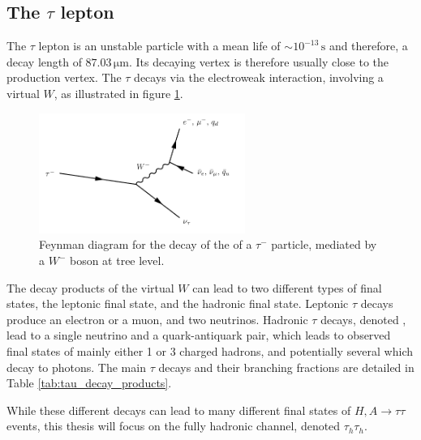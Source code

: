 \subsection{The $\tau$ lepton}
\label{sec:tau_lepton}
The $\tau$ lepton is an unstable particle with a mean life of $\sim 10^{-13}\,\mathrm{s}$ \cite{pdg2016} and therefore, a decay length of $87.03\, \mathrm{\mu m}$. Its decaying vertex is therefore usually close to the production vertex. The $\tau$ decays via the electroweak interaction, involving a virtual $W$, as illustrated in figure \ref{fig:tau_decay}.

\begin{figure}
    \centering
    \includegraphics[width=0.6\textwidth]{Images/taudecay.pdf}
    \caption{Feynman diagram for the decay of the of a $\tau^-$ particle, mediated by a $W^-$ boson at tree level.}
    \label{fig:tau_decay}
\end{figure}

The decay products of the virtual $W$ can lead to two different types of final states, the leptonic final state, and the hadronic final state. Leptonic $\tau$ decays produce an electron or a muon, and two neutrinos. Hadronic $\tau$ decays, denoted \tauh, lead to a single neutrino and a quark-antiquark pair, which leads to observed final states of mainly either 1 or 3 charged hadrons, and potentially several \pizero which decay to photons. The main $\tau$ decays and their branching fractions are detailed in Table \ref{tab:tau_decay_products}. 

While these different decays can lead to many different final states of $H,A \rightarrow \tau\tau$ events, this thesis will focus on the fully hadronic channel, denoted $\tau_h \tau_h$.


